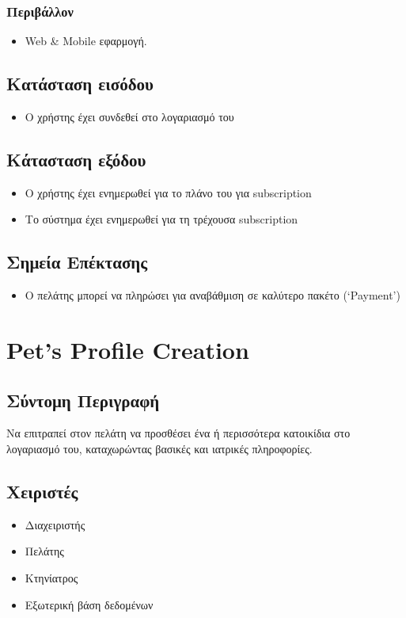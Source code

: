 \documentclass[12pt,a4paper,twoside]{book}
\begin{document}
\subsubsection{Περιβάλλον}
\begin{itemize}
  \item Web \& Mobile εφαρμογή.
\end{itemize}

\subsection{Κατάσταση εισόδου} %
\begin{itemize}
  \item Ο χρήστης έχει συνδεθεί στο λογαριασμό του %
\end{itemize}

\subsection{Κάτασταση εξόδου} %
\begin{itemize}
  \item Ο χρήστης έχει ενημερωθεί για το πλάνο του για subscription
  \item Το σύστημα έχει ενημερωθεί για τη τρέχουσα subscription
\end{itemize}

\subsection{Σημεία Επέκτασης}
\begin{itemize}
  \item Ο πελάτης μπορεί να πληρώσει για αναβάθμιση σε καλύτερο πακέτο (`Payment') %
\end{itemize}

\section{Pet's Profile Creation} %

\subsection{Σύντομη Περιγραφή}
Να επιτραπεί στον πελάτη να προσθέσει ένα ή περισσότερα κατοικίδια στο λογαριασμό του, καταχωρώντας βασικές και ιατρικές πληροφορίες. %

\subsection{Χειριστές}
\begin{itemize}
  \item Διαχειριστής
  \item Πελάτης
  \item Κτηνίατρος
  \item Εξωτερική βάση δεδομένων %
\end{itemize}
\end{document}
